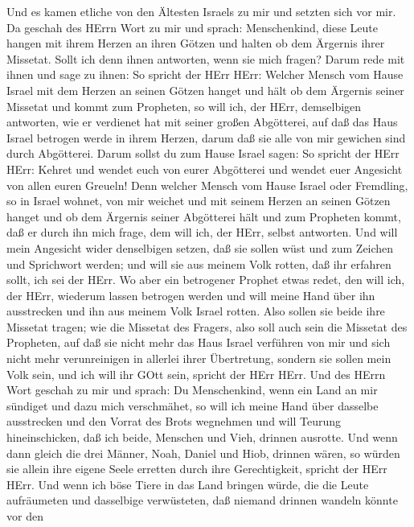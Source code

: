  Und es kamen etliche von den Ältesten Israels zu mir und
setzten sich vor mir.  Da geschah des HErrn Wort zu mir und
sprach:  Menschenkind, diese Leute hangen mit ihrem Herzen
an ihren Götzen und halten ob dem Ärgernis ihrer Missetat. Sollt ich
denn ihnen antworten, wenn sie mich fragen?  Darum rede mit
ihnen und sage zu ihnen: So spricht der HErr HErr: Welcher Mensch vom
Hause Israel mit dem Herzen an seinen Götzen hanget und hält ob dem
Ärgernis seiner Missetat und kommt zum Propheten, so will ich, der HErr,
demselbigen antworten, wie er verdienet hat mit seiner großen
Abgötterei,  auf daß das Haus Israel betrogen werde in ihrem
Herzen, darum daß sie alle von mir gewichen sind durch Abgötterei.
 Darum sollst du zum Hause Israel sagen: So spricht der HErr
HErr: Kehret und wendet euch von eurer Abgötterei und wendet euer
Angesicht von allen euren Greueln!  Denn welcher Mensch vom
Hause Israel oder Fremdling, so in Israel wohnet, von mir weichet und
mit seinem Herzen an seinen Götzen hanget und ob dem Ärgernis seiner
Abgötterei hält und zum Propheten kommt, daß er durch ihn mich frage,
dem will ich, der HErr, selbst antworten.  Und will mein
Angesicht wider denselbigen setzen, daß sie sollen wüst und zum Zeichen
und Sprichwort werden; und will sie aus meinem Volk rotten, daß ihr
erfahren sollt, ich sei der HErr.  Wo aber ein betrogener
Prophet etwas redet, den will ich, der HErr, wiederum lassen betrogen
werden und will meine Hand über ihn ausstrecken und ihn aus meinem Volk
Israel rotten.  Also sollen sie beide ihre Missetat tragen;
wie die Missetat des Fragers, also soll auch sein die Missetat des
Propheten,  auf daß sie nicht mehr das Haus Israel
verführen von mir und sich nicht mehr verunreinigen in allerlei ihrer
Übertretung, sondern sie sollen mein Volk sein, und ich will ihr GOtt
sein, spricht der HErr HErr.  Und des HErrn Wort geschah zu
mir und sprach:  Du Menschenkind, wenn ein Land an mir
sündiget und dazu mich verschmähet, so will ich meine Hand über dasselbe
ausstrecken und den Vorrat des Brots wegnehmen und will Teurung
hineinschicken, daß ich beide, Menschen und Vieh, drinnen ausrotte.
 Und wenn dann gleich die drei Männer, Noah, Daniel und
Hiob, drinnen wären, so würden sie allein ihre eigene Seele erretten
durch ihre Gerechtigkeit, spricht der HErr HErr.  Und wenn
ich böse Tiere in das Land bringen würde, die die Leute aufräumeten und
dasselbige verwüsteten, daß niemand drinnen wandeln könnte vor den
